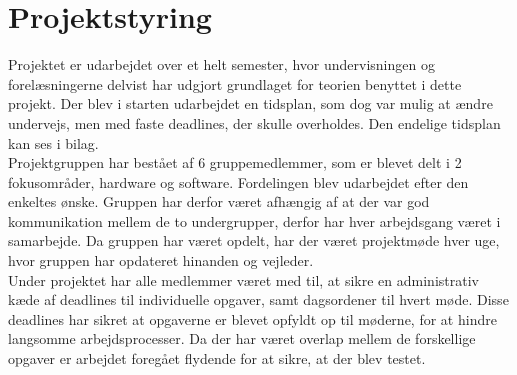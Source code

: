 \section{Projektstyring}
Projektet er udarbejdet over et helt semester, hvor undervisningen og forelæsningerne delvist har udgjort grundlaget for teorien benyttet i dette projekt. Der blev i starten udarbejdet en tidsplan, som dog var mulig at ændre undervejs, men med faste deadlines, der skulle overholdes. Den endelige tidsplan kan ses i bilag. \\
Projektgruppen har bestået af 6 gruppemedlemmer, som er blevet delt i 2 fokusområder, hardware og software. Fordelingen blev udarbejdet efter den enkeltes ønske. Gruppen har derfor været afhængig af at der var god kommunikation mellem de to undergrupper, derfor har hver arbejdsgang været i samarbejde. Da gruppen har været opdelt, har der været projektmøde hver uge, hvor gruppen har opdateret hinanden og vejleder. \\
Under projektet har alle medlemmer været med til, at sikre en administrativ kæde af deadlines til individuelle opgaver, samt dagsordener til hvert møde. Disse deadlines har sikret at opgaverne er blevet opfyldt op til møderne, for at hindre langsomme arbejdsprocesser. Da der har været overlap mellem de forskellige opgaver er arbejdet foregået flydende for at sikre, at der blev testet. 

